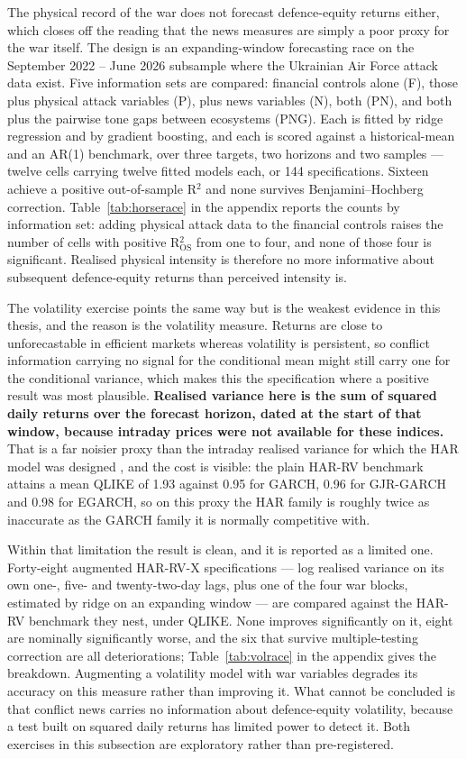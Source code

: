 \documentclass[12pt,a4paper]{article}
\begin{document}
The physical record of the war does not forecast defence-equity returns either, which closes off the reading that the news measures are simply a poor proxy for the war itself. The design is an expanding-window forecasting race on the September 2022 -- June 2026 subsample where the Ukrainian Air Force attack data exist. Five information sets are compared: financial controls alone (F), those plus physical attack variables (P), plus news variables (N), both (PN), and both plus the pairwise tone gaps between ecosystems (PNG). Each is fitted by ridge regression and by gradient boosting, and each is scored against a historical-mean and an AR(1) benchmark, over three targets, two horizons and two samples --- twelve cells carrying twelve fitted models each, or 144 specifications. Sixteen achieve a positive out-of-sample R$^2$ and none survives Benjamini--Hochberg correction. Table~\ref{tab:horserace} in the appendix reports the counts by information set: adding physical attack data to the financial controls raises the number of cells with positive R$^2_{\text{OS}}$ from one to four, and none of those four is significant. Realised physical intensity is therefore no more informative about subsequent defence-equity returns than perceived intensity is.

The volatility exercise points the same way but is the weakest evidence in this thesis, and the reason is the volatility measure. Returns are close to unforecastable in efficient markets whereas volatility is persistent, so conflict information carrying no signal for the conditional mean might still carry one for the conditional variance, which makes this the specification where a positive result was most plausible. \textbf{Realised variance here is the sum of squared daily returns over the forecast horizon, dated at the start of that window, because intraday prices were not available for these indices.} That is a far noisier proxy than the intraday realised variance for which the HAR model was designed \citep{corsi2009}, and the cost is visible: the plain HAR-RV benchmark attains a mean QLIKE of 1.93 against 0.95 for GARCH, 0.96 for GJR-GARCH and 0.98 for EGARCH, so on this proxy the HAR family is roughly twice as inaccurate as the GARCH family it is normally competitive with.

Within that limitation the result is clean, and it is reported as a limited one. Forty-eight augmented HAR-RV-X specifications --- log realised variance on its own one-, five- and twenty-two-day lags, plus one of the four war blocks, estimated by ridge on an expanding window --- are compared against the HAR-RV benchmark they nest, under QLIKE. None improves significantly on it, eight are nominally significantly worse, and the six that survive multiple-testing correction are all deteriorations; Table~\ref{tab:volrace} in the appendix gives the breakdown. Augmenting a volatility model with war variables degrades its accuracy on this measure rather than improving it. What cannot be concluded is that conflict news carries no information about defence-equity volatility, because a test built on squared daily returns has limited power to detect it. Both exercises in this subsection are exploratory rather than pre-registered.
\end{document}
